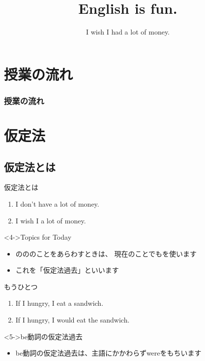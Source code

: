 \documentclass[aspectratio=169,xcolor={dvipsnames,table}]{beamer}
\title{English is fun.}
\subtitle{I wish I had a lot of money.}
\author{}
\institute[]{}
\date[]
\begin{document}
\begin{frame}[plain]
  \titlepage
\end{frame}

\section*{授業の流れ}
\begin{frame}[plain]
  \frametitle{授業の流れ}
  \tableofcontents
\end{frame}

\section{仮定法}
\subsection{仮定法とは}
\begin{frame}[plain]{仮定法とは}
 \large

\begin{enumerate}
 \item<1-> I don't have a lot of money.
 \item<2-> I wish I  a lot of money.\hfill{}
\end{enumerate}

\vfill

\begin{block}<4->{Topics for Today}
\small

\begin{itemize}
 \item {}のののことをあらわすときは、
現在のことでもを使います
 \item これを「仮定法過去」といいます
\end{itemize}
\end{block}

\end{frame}
\begin{frame}[plain]{もうひとつ}
 \begin{enumerate}
  \item<1-> If I  hungry, I  eat a sandwich.%
\hfill{}
  \item<3-> If I  hungry, I would eat the sandwich.%
\hfill{}\\
\hfill{}
 \end{enumerate}

\vfill

\begin{block}<5->{be動詞の仮定法過去}
\small

\begin{itemize}
 \item be動詞の仮定法過去は、主語にかかわらずwereをもちいます
\end{itemize}
\end{block}
\end{frame}
\end{document}
